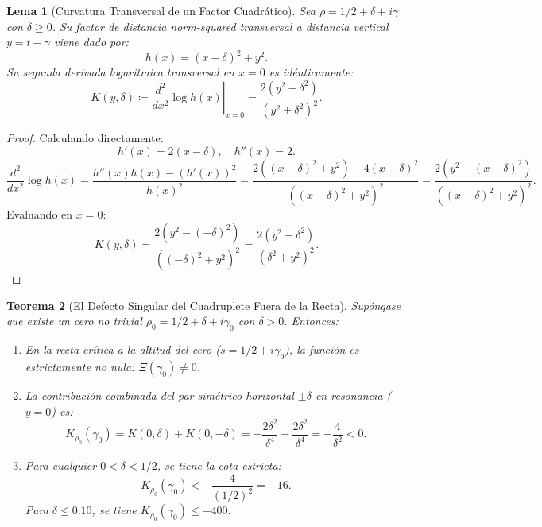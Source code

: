 \documentclass[11pt,a4paper]{article}
\newtheorem{theorem}{Teorema}[section]
\newtheorem{lemma}[theorem]{Lema}
\theoremstyle{definition}
\theoremstyle{remark}
\begin{document}
\begin{lemma}[Curvatura Transversal de un Factor Cuadrático]
\label{lem:curvatura_factor_cuad}
Sea $\rho = 1/2 + \delta + i\gamma$ con $\delta \ge 0$. Su factor de distancia norm-squared transversal a distancia vertical $y = t - \gamma$ viene dado por:
\begin{equation}
h(x) = (x - \delta)^2 + y^2.
\end{equation}
Su segunda derivada logarítmica transversal en $x = 0$ es idénticamente:
\begin{equation}
K(y, \delta) \coloneqq \left.\frac{d^2}{dx^2}\log h(x)\right|_{x=0} = \frac{2(y^2 - \delta^2)}{(y^2 + \delta^2)^2}.
\end{equation}
\end{lemma}

\begin{proof}
Calculando directamente:
\[
h'(x) = 2(x - \delta), \quad h''(x) = 2.
\]
\[
\frac{d^2}{dx^2}\log h(x) = \frac{h''(x) h(x) - (h'(x))^2}{h(x)^2} = \frac{2((x - \delta)^2 + y^2) - 4(x - \delta)^2}{((x - \delta)^2 + y^2)^2} = \frac{2(y^2 - (x - \delta)^2)}{((x - \delta)^2 + y^2)^2}.
\]
Evaluando en $x = 0$:
\[
K(y, \delta) = \frac{2(y^2 - (-\delta)^2)}{((-\delta)^2 + y^2)^2} = \frac{2(y^2 - \delta^2)}{(\delta^2 + y^2)^2}.
\]
\end{proof}

\begin{theorem}[El Defecto Singular del Cuadruplete Fuera de la Recta]
\label{thm:defecto_cuadruplete_experto}
Supóngase que existe un cero no trivial $\rho_0 = 1/2 + \delta + i\gamma_0$ con $\delta > 0$. Entonces:
\begin{enumerate}
    \item En la recta crítica a la altitud del cero ($s = 1/2 + i\gamma_0$), la función es estrictamente no nula: $\Xi(\gamma_0) \neq 0$.
    \item La contribución combinada del par simétrico horizontal $\pm \delta$ en resonancia ($y = 0$) es:
    \begin{equation}
    K_{\rho_0}(\gamma_0) = K(0, \delta) + K(0, -\delta) = -\frac{2\delta^2}{\delta^4} - \frac{2\delta^2}{\delta^4} = -\frac{4}{\delta^2} < 0.
    \end{equation}
    \item Para cualquier $0 < \delta < 1/2$, se tiene la cota estricta:
    \begin{equation}
    K_{\rho_0}(\gamma_0) < -\frac{4}{(1/2)^2} = -16.
    \end{equation}
    Para $\delta \le 0.10$, se tiene $K_{\rho_0}(\gamma_0) \le -400$.
\end{enumerate}
\end{theorem}
\end{document}
